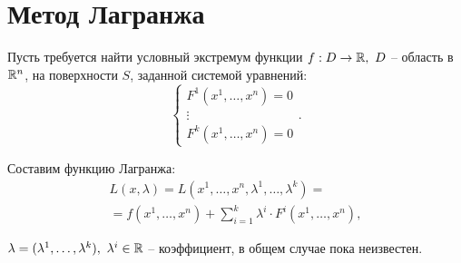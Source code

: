 \newpage

\section*{Метод Лагранжа}

\begin{task}
    Пусть требуется найти условный экстремум функции $f:D\rightarrow\mathbb{R}, \ D$ -- область в $\mathbb{R}^n$, на поверхности $S$, заданной системой уравнений:
    \[
        \left\{\begin{array}{l}
            F^1(x^1,\ldots,x^n) = 0 \\
            \vdots                  \\
            F^k(x^1,\ldots,x^n) = 0
          \end{array}\right..
    \]
    
    Составим функцию Лагранжа:
    \begin{multline*}
      L(x,\lambda) = L(x^1,\ldots,x^n,\lambda^1,\ldots,\lambda^k) = \\
      = f(x^1,\ldots,x^n) + \sum_{i=1}^{k}\lambda^i\cdot F^i(x^1,\ldots,x^n),
    \end{multline*}
    
    $\lambda = (\lambda^1,\ldots,\lambda^k), \ \lambda^i \in \R$ -- коэффициент, в общем случае пока неизвестен.
    

\end{task}
